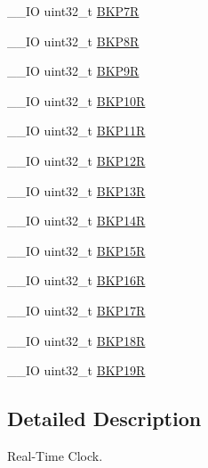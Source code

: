 \begin{DoxyCompactItemize}
\item 
\-\_\-\-\_\-\-I\-O uint32\-\_\-t \hyperlink{struct_r_t_c___type_def_a2ca54ce1a8d2fa9d1ba6d5987ed5e2cf}{B\-K\-P7\-R}
\item 
\-\_\-\-\_\-\-I\-O uint32\-\_\-t \hyperlink{struct_r_t_c___type_def_ac1085f6aae54b353c30871fe90c59851}{B\-K\-P8\-R}
\item 
\-\_\-\-\_\-\-I\-O uint32\-\_\-t \hyperlink{struct_r_t_c___type_def_a6c33564df6eaf97400e0457dde9b14ef}{B\-K\-P9\-R}
\item 
\-\_\-\-\_\-\-I\-O uint32\-\_\-t \hyperlink{struct_r_t_c___type_def_aade2881a3e408bfd106b27f78bbbcfc9}{B\-K\-P10\-R}
\item 
\-\_\-\-\_\-\-I\-O uint32\-\_\-t \hyperlink{struct_r_t_c___type_def_ac66d5e2d3459cff89794c47dbc8f7228}{B\-K\-P11\-R}
\item 
\-\_\-\-\_\-\-I\-O uint32\-\_\-t \hyperlink{struct_r_t_c___type_def_a6f7eee5ae8a32c07f9c8fe14281bdaf3}{B\-K\-P12\-R}
\item 
\-\_\-\-\_\-\-I\-O uint32\-\_\-t \hyperlink{struct_r_t_c___type_def_a6ed4c3a0d4588a75078e9f8e376b4d06}{B\-K\-P13\-R}
\item 
\-\_\-\-\_\-\-I\-O uint32\-\_\-t \hyperlink{struct_r_t_c___type_def_ac60f13e6619724747e61cfbff55b9fab}{B\-K\-P14\-R}
\item 
\-\_\-\-\_\-\-I\-O uint32\-\_\-t \hyperlink{struct_r_t_c___type_def_afafaddc3a983eb71332b7526d82191ad}{B\-K\-P15\-R}
\item 
\-\_\-\-\_\-\-I\-O uint32\-\_\-t \hyperlink{struct_r_t_c___type_def_ad2f2eb2fb4b93e21515b10e920e719b6}{B\-K\-P16\-R}
\item 
\-\_\-\-\_\-\-I\-O uint32\-\_\-t \hyperlink{struct_r_t_c___type_def_a2842aa523df62f3508316eb3b2e08f4e}{B\-K\-P17\-R}
\item 
\-\_\-\-\_\-\-I\-O uint32\-\_\-t \hyperlink{struct_r_t_c___type_def_a640ccb2ccfb6316b88c070362dc29339}{B\-K\-P18\-R}
\item 
\-\_\-\-\_\-\-I\-O uint32\-\_\-t \hyperlink{struct_r_t_c___type_def_a4ec1dd54d976989b7c9e59fb14d974fb}{B\-K\-P19\-R}
\end{DoxyCompactItemize}


\subsection{Detailed Description}
Real-\/\-Time Clock. 

